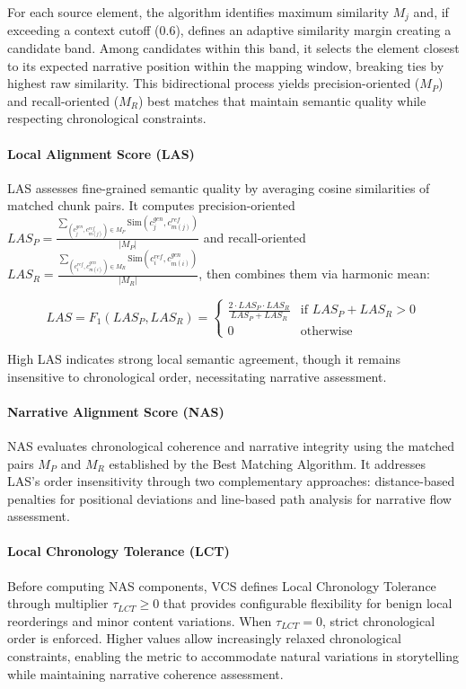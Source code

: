 \documentclass[letterpaper]{article} %
\begin{document}
For each source element, the algorithm identifies maximum similarity $M_j$ and, if exceeding a context cutoff (0.6), defines an adaptive similarity margin creating a candidate band. Among candidates within this band, it selects the element closest to its expected narrative position within the mapping window, breaking ties by highest raw similarity. This bidirectional process yields precision-oriented ($M_P$) and recall-oriented ($M_R$) best matches that maintain semantic quality while respecting chronological constraints.

\paragraph{Local Alignment Score (LAS)}
LAS assesses fine-grained semantic quality by averaging cosine similarities of matched chunk pairs. It computes precision-oriented $LAS_P = \frac{\sum_{(c_{j}^{gen},c_{m(j)}^{ref})\in M_P}\text{Sim}(c_{j}^{gen},c_{m(j)}^{ref})}{|M_P|}$ and recall-oriented $LAS_R = \frac{\sum_{(c_{i}^{ref},c_{m(i)}^{gen})\in M_R}\text{Sim}(c_{i}^{ref},c_{m(i)}^{gen})}{|M_R|}$, then combines them via harmonic mean:

\begin{equation} \label{eq:las_revised}
LAS = F_1(LAS_P, LAS_R) =
\begin{cases}
\frac{2 \cdot LAS_P \cdot LAS_R}{LAS_P + LAS_R} & \text{if } LAS_P + LAS_R > 0 \\
0 & \text{otherwise}
\end{cases}
\end{equation}

High LAS indicates strong local semantic agreement, though it remains insensitive to chronological order, necessitating narrative assessment.

\paragraph{Narrative Alignment Score (NAS)}
NAS evaluates chronological coherence and narrative integrity using the matched pairs $M_P$ and $M_R$ established by the Best Matching Algorithm. It addresses LAS's order insensitivity through two complementary approaches: distance-based penalties for positional deviations and line-based path analysis for narrative flow assessment.

\paragraph{Local Chronology Tolerance (LCT)}
Before computing NAS components, VCS defines Local Chronology Tolerance through multiplier $\tau_{LCT} \geq 0$ that provides configurable flexibility for benign local reorderings and minor content variations. When $\tau_{LCT}=0$, strict chronological order is enforced. Higher values allow increasingly relaxed chronological constraints, enabling the metric to accommodate natural variations in storytelling while maintaining narrative coherence assessment.
\end{document}
